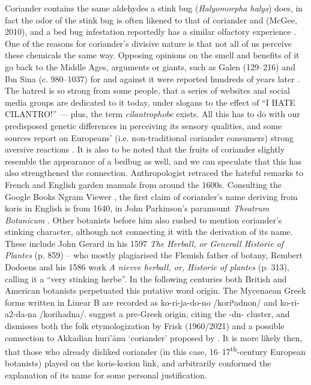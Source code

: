 \documentclass[12pt]{article}
\begin{document}
Coriander contains the same aldehydes a stink bug (\textit{Halyomorpha halys}) does, in fact the odor of the stink bug is often likened to that of coriander and (McGee, 2010), and a bed bug infestation reportedly has a similar olfactory experience \parencite{davidson_oxford_2014}. One of the reasons for coriander’s divisive nature is that not all of us perceive these chemicals the same way. Opposing opinions on the smell and benefits of it go back to the Middle Ages, arguments or giants, such as Galen (129--216) and Ibn Sina (c. 980--1037) for and against it were reported hundreds of years later \parencite[cf.][]{parkinson_theatrum_1640}. The hatred is so strong from some people, that a series of websites and social media groups are dedicated to it today, under slogans to the effect of “I HATE CILANTRO!” — plus, the term \emph{cilantrophobe} exists. All this has to do with our predisposed genetic differences in perceiving its sensory qualities, and some sources report on Europeans’ (i.e. non-traditional coriander consumers) strong aversive reactions \parencite{eriksson_genetic_2012}. It is also to be noted that the fruits of coriander slightly resemble the appearance of a bedbug as well, and we can speculate that this has also strengthened the connection. Anthropologist \textcite{leach_rehabilitating_2001} retraced the hateful remarks to French and English garden manuals from around the 1600s.
Consulting the Google Books Ngram Viewer \parencite{michel_quantitative_2011}, the first claim of coriander’s name deriving from koris in English is from 1640, in John Parkinson’s paramount \textit{Theatrum Botanicum} \parencite[918-919]{parkinson_theatrum_1640}. Other botanists before him also rushed to mention coriander’s stinking character, although not connecting it with the derivation of its name. These include John Gerard in his 1597 \textit{The Herball, or Generall Historie of Plantes} (p. 859) – who mostly plagiarised the Flemish father of botany, Rembert Dodoens and his 1586 work \textit{A nievve herball, or, Historie of plantes} (p. 313), calling it a “very stinking herbe”. In the following centuries both British and American botanists perpetuated this putative word origin. The Mycenaean Greek forms written in Linear B are recorded as ko-ri-ja-do-no /koriʰadnon/ and ko-ri-a2-da-na /korihadna/. \textcite[754]{beekes_etymological_2010} suggest a pre-Greek origin, citing the -dn- cluster, and dismisses both the folk etymologization by \textcite{frisk_griechisches_2021} Frisk (1960/2021) and a possible connection to Akkadian huri’ānu ‘coriander’ proposed by \textcite{szemerenyi_review_1971}. It is more likely then, that those who already disliked coriander (in this case, 16--17\textsuperscript{th}-century European botanists) played on the koris-korion link, and arbitrarily conformed the explanation of its name for some personal justification.
\end{document}
